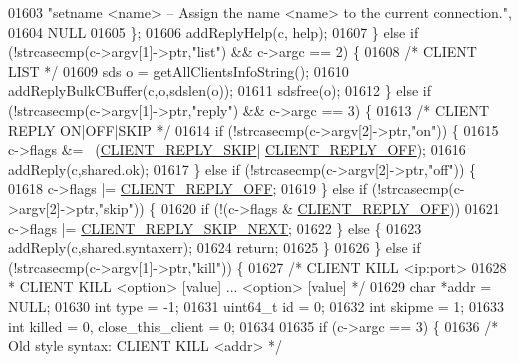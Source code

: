 \begin{DoxyCode}
{{{{{{{{{{{{{{{{{{{01603 \textcolor{stringliteral}{"setname <name> -- Assign the name <name> to the current connection."},
01604 NULL
01605         \};
01606         addReplyHelp(c, help);
01607     \} \textcolor{keywordflow}{else} \textcolor{keywordflow}{if} (!strcasecmp(c->argv[1]->ptr,\textcolor{stringliteral}{"list"}) && c->argc == 2) \{
01608         \textcolor{comment}{/* CLIENT LIST */}
01609         sds o = getAllClientsInfoString();
01610         addReplyBulkCBuffer(c,o,sdslen(o));
01611         sdsfree(o);
01612     \} \textcolor{keywordflow}{else} \textcolor{keywordflow}{if} (!strcasecmp(c->argv[1]->ptr,\textcolor{stringliteral}{"reply"}) && c->argc == 3) \{
01613         \textcolor{comment}{/* CLIENT REPLY ON|OFF|SKIP */}
01614         \textcolor{keywordflow}{if} (!strcasecmp(c->argv[2]->ptr,\textcolor{stringliteral}{"on"})) \{
01615             c->flags &= ~(\hyperlink{server_8h_a792a906c445537043944477fdaad11f4}{CLIENT\_REPLY\_SKIP}|
      \hyperlink{server_8h_a9e2a01b79b4567285f1eccbbe0ed35d1}{CLIENT\_REPLY\_OFF});
01616             addReply(c,shared.ok);
01617         \} \textcolor{keywordflow}{else} \textcolor{keywordflow}{if} (!strcasecmp(c->argv[2]->ptr,\textcolor{stringliteral}{"off"})) \{
01618             c->flags |= \hyperlink{server_8h_a9e2a01b79b4567285f1eccbbe0ed35d1}{CLIENT\_REPLY\_OFF};
01619         \} \textcolor{keywordflow}{else} \textcolor{keywordflow}{if} (!strcasecmp(c->argv[2]->ptr,\textcolor{stringliteral}{"skip"})) \{
01620             \textcolor{keywordflow}{if} (!(c->flags & \hyperlink{server_8h_a9e2a01b79b4567285f1eccbbe0ed35d1}{CLIENT\_REPLY\_OFF}))
01621                 c->flags |= \hyperlink{server_8h_a8d5a7abb547f5b34961d11900bd95b00}{CLIENT\_REPLY\_SKIP\_NEXT};
01622         \} \textcolor{keywordflow}{else} \{
01623             addReply(c,shared.syntaxerr);
01624             \textcolor{keywordflow}{return};
01625         \}
01626     \} \textcolor{keywordflow}{else} \textcolor{keywordflow}{if} (!strcasecmp(c->argv[1]->ptr,\textcolor{stringliteral}{"kill"})) \{
01627         \textcolor{comment}{/* CLIENT KILL <ip:port>}
01628 \textcolor{comment}{         * CLIENT KILL <option> [value] ... <option> [value] */}
01629         \textcolor{keywordtype}{char} *addr = NULL;
01630         \textcolor{keywordtype}{int} type = -1;
01631         uint64\_t id = 0;
01632         \textcolor{keywordtype}{int} skipme = 1;
01633         \textcolor{keywordtype}{int} killed = 0, close\_this\_client = 0;
01634 
01635         \textcolor{keywordflow}{if} (c->argc == 3) \{
01636             \textcolor{comment}{/* Old style syntax: CLIENT KILL <addr> */}
}}}}}}}}}}}}}}}}}}}
\end{DoxyCode}
